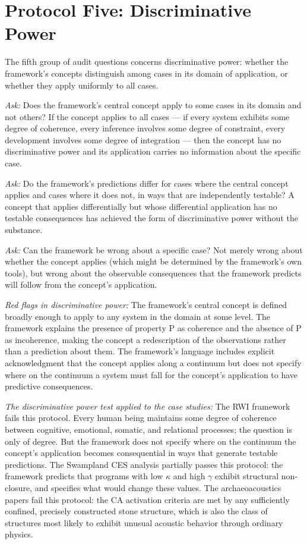 \documentclass[12pt, openright, twoside]{book}
\begin{document}
\section{Protocol Five: Discriminative Power}

The fifth group of audit questions concerns discriminative power: whether
the framework's concepts distinguish among cases in its domain of application,
or whether they apply uniformly to all cases.

\textit{Ask:} Does the framework's central concept apply to some cases
in its domain and not others? If the concept applies to all cases --- if
every system exhibits some degree of coherence, every inference involves
some degree of constraint, every development involves some degree of
integration --- then the concept has no discriminative power and its
application carries no information about the specific case.

\textit{Ask:} Do the framework's predictions differ for cases where the
central concept applies and cases where it does not, in ways that are
independently testable? A concept that applies differentially but whose
differential application has no testable consequences has achieved the
form of discriminative power without the substance.

\textit{Ask:} Can the framework be wrong about a specific case? Not merely
wrong about whether the concept applies (which might be determined by
the framework's own tools), but wrong about the observable consequences
that the framework predicts will follow from the concept's application.

\textit{Red flags in discriminative power:} The framework's central
concept is defined broadly enough to apply to any system in the domain
at some level. The framework explains the presence of property P as
coherence and the absence of P as incoherence, making the concept a
redescription of the observations rather than a prediction about them.
The framework's language includes explicit acknowledgment that the concept
applies along a continuum but does not specify where on the continuum
a system must fall for the concept's application to have predictive
consequences.

\textit{The discriminative power test applied to the case studies:}
The RWI framework fails this protocol. Every human being maintains some
degree of coherence between cognitive, emotional, somatic, and relational
processes; the question is only of degree. But the framework does not
specify where on the continuum the concept's application becomes
consequential in ways that generate testable predictions. The Swampland
CES analysis partially passes this protocol: the framework predicts
that programs with low $\kappa$ and high $\gamma$ exhibit structural
non-closure, and specifies what would change these values. The
archaeoacoustics papers fail this protocol: the CA activation criteria
are met by any sufficiently confined, precisely constructed stone structure,
which is also the class of structures most likely to exhibit unusual
acoustic behavior through ordinary physics.
\end{document}
